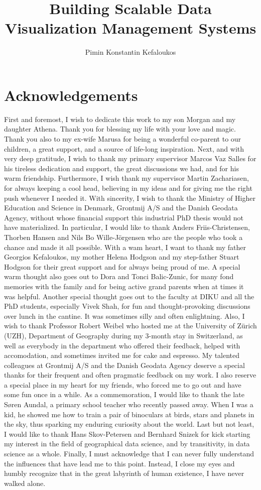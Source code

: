 \documentclass[11pt, oneside]{report}
\title{Building Scalable Data Visualization Management Systems}
\author{Pimin Konstantin Kefaloukos}
\begin{document}
\maketitle

\section*{Acknowledgements}
First and foremost, I wish to dedicate this work to my son Morgan and my daughter Athena. Thank you for blessing my life with your love and magic. Thank you also to my ex-wife Marusa for being a wonderful co-parent to our children, a great support, and a source of life-long inspiration. Next, and with very deep gratitude, I wish to thank my primary supervisor Marcos Vaz Salles for his tireless dedication and support, the great discussions we had, and for his warm friendship. Furthermore, I wish thank my supervisor Martin Zachariasen, for always keeping a cool head, believing in my ideas and for giving me the right push whenever I needed it. With sincerity, I wish to thank the Ministry of Higher Education and Science in Denmark, Grontmij A/S and the Danish Geodata Agency, without whose financial support this industrial PhD thesis would not have materialized. In particular, I would like to thank Anders Friis-Christensen, Thorben Hansen and Nils Bo Wille-J{\"o}rgensen who are the people who took a chance and made it all possible. With a wam heart, I want to thank my father Georgios Kefaloukos, my mother Helena Hodgson and my step-father Stuart Hodgson for their great support and for always being proud of me. A special warm thought also goes out to Dora and Tonci Balic-Zunic, for many fond memories with the family and for being active grand parents when at times it was helpful. Another special thought goes out to the faculty at DIKU and all the PhD students, especially Vivek Shah, for fun and thought-provoking discussions over lunch in the cantine. It was sometimes silly and often enlightning. Also, I wish to thank Professor Robert Weibel who hosted me at the University of Z{\"u}rich (UZH), Department of Geography during my 3-month stay in Switzerland, as well as everybody in the department who offered their feedback, helped with accomodation, and sometimes invited me for cake and espresso. My talented colleagues at Grontmij A/S and the Danish Geodata Agency deserve a special thanks for their frequent and often pragmatic feedback on my work. I also reserve a special place in my heart for my friends, who forced me to go out and have some fun once in a while. As a commemoration, I would like to thank the late S{\o}ren Aundal, a primary school teacher who recently passed away. When I was a kid, he showed me how to train a pair of binoculars at birds, stars and planets in the sky, thus sparking my enduring curiosity about the world. Last but not least, I would like to thank Hans Skov-Petersen and Bernhard Snizek for kick starting my interest in the field of geographical data science, and by transitivity, in data science as a whole. Finally, I must acknowledge that I can never fully understand the influences that have lead me to this point. Instead, I close my eyes and humbly recognize that in the great labyrinth of human existence, I have never walked alone.
\end{document}
